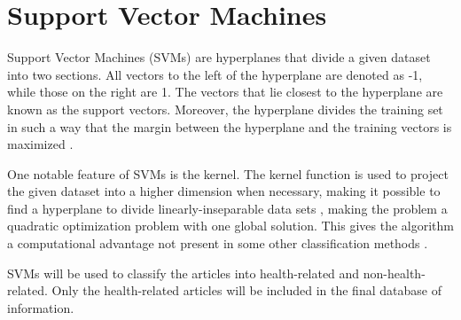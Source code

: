 \section{Support Vector Machines}
Support Vector Machines (SVMs) are hyperplanes that divide a given dataset into two sections. All vectors to the left of the hyperplane are denoted as -1, while those on the right are 1. The vectors that lie closest to the hyperplane are known as the support vectors. Moreover, the hyperplane divides the training set in such a way that the margin between the hyperplane and the training vectors is maximized \cite{tong2001support}.

One notable feature of SVMs is the kernel. The kernel function is used to project the given dataset into a higher dimension when necessary, making it possible to find a hyperplane to divide linearly-inseparable data sets \cite{tong2001support}, making the problem a quadratic optimization problem with one global solution. This gives the algorithm a computational advantage not present in some other classification methods \cite{ben2001support}.

SVMs will be used to classify the articles into health-related and non-health-related. Only the health-related articles will be included in the final database of information.
